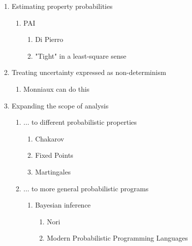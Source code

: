 \begin{enumerate}
 \item Estimating property probabilities
   \begin{enumerate}
    \item PAI
     \begin{enumerate}
      \item Di Pierro
      \item "Tight" in a least-square sense
     \end{enumerate}
   \end{enumerate}

 \item Treating uncertainty expressed as non-determinism
   \begin{enumerate}
    \item Monniaux can do this 
   \end{enumerate}

 \item Expanding the scope of analysis
   \begin{enumerate}
    \item ... to different probabilistic properties
      \begin{enumerate}
        \item Chakarov
        \item Fixed Points
        \item Martingales
      \end{enumerate}
    \item ... to more general probabilistic programs
      \begin{enumerate}
        \item Bayesian inference
          \begin{enumerate}
            \item Nori
            \item Modern Probabilistic Programming Languages
          \end{enumerate}
      \end{enumerate}
   \end{enumerate}

\end{enumerate}
